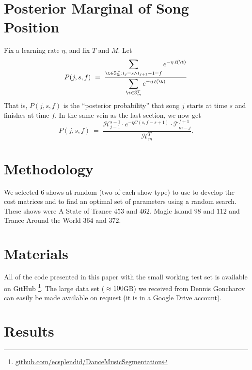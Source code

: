 \documentclass[twocolumn]{article}
\DeclareMathOperator{\loss}{\ell}
\newcommand{\segs}{\mathbb S}
\newcommand{\head}{\mathcal H}
\newcommand{\tail}{\mathcal T}
\begin{document}
\section{Posterior Marginal of Song Position}
Fix a learning rate $\eta$, and fix $T$ and $M$. Let
\[
P(j,s,f) ~=~ 
\frac{\displaystyle
	\sum_{\t \in \segs^T_m : t_j = s \land t_{j+1}-1 = f} e^{- \eta \loss(\t)}
}{\displaystyle
\sum_{\t \in \segs^T_m} e^{- \eta \loss(\t)}
}
\]
That is, $P(j,s,f)$ is the ``posterior probability'' that song $j$ starts at time $s$ and finishes at time $f$.
%
In the same vein as the last section, we now get
\[
P(j,s,f) ~=~ \frac{\head^{s-1}_{j-1} \cdot e^{-\eta C(s, f-s+1)} \cdot \tail^{f+1}_{m-j}}{\head^T_m}.
\]

\section{Methodology}

We selected $6$ shows at random (two of each show type) to use to develop the cost matrices and to find an optimal set of parameters using a random search. These shows were A State of Trance $453$ and $462$. Magic Island $98$ and $112$ and Trance Around the World $364$ and $372$.



\section{Materials}

All of the code presented in this paper with the small working test set is available on GitHub \footnote{\url{github.com/ecsplendid/DanceMusicSegmentation}}. The large data set ($\approx100$GB) we received from Dennis Goncharov can easily be made available on request (it is in a Google Drive account).

\section{Results}
\end{document}
